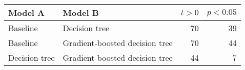 \begin{tabular}{llrr}
  \toprule
  Model A       & Model B                        & $t > 0$ & $p < 0.05$
  \\
  \midrule
  Baseline      & Decision tree                  & 70      & 39
  \\
  Baseline      & Gradient-boosted decision tree & 70      & 44
  \\
  Decision tree & Gradient-boosted decision tree & 44      & 7
  \\
  \bottomrule
\end{tabular}
